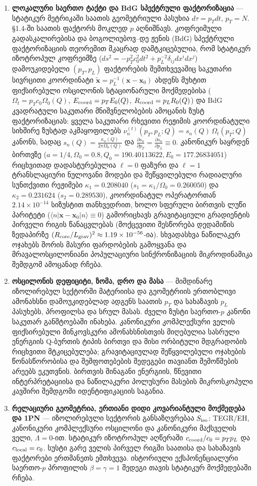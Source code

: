 \documentclass[11pt,a4paper]{article}
\begin{document}
\begin{enumerate}[label=\arabic*.]
\item \textbf{ლოკალური საერთო ტაქტი და BdG სპექტრული ფაქტორიზაცია} — სტატიკურ მეტრიკაში საათის გეომეტრიული პასუხია $d\tau=p_Tdt$, $p_T=N$. §1.4-ში საათის ფაქტორს მოკლედ $p$ აღნიშნავს. კოფრეიმული გადასკალირებისა და ბოგოლიუბოვ–დე ჟენის (BdG) სპექტრული ფაქტორიზაციის თეორემით მკაცრად დამტკიცებულია, რომ სტატიკურ იზოტროპულ კოფრეიმზე ($ds^2 = -p_T^2 c_0^2 dt^2 + p_L^{-2}\delta_{ij}dx^i dx^j$) დამოუკიდებელი $(p_T, p_L)$ ფაქტორების შემთხვევაშიც საკუთარი სივრცითი კოორდინატი $\tilde{\mathbf{x}} = p_L^{-1}(\mathbf{x}-\mathbf{x}_0)$ ახდენს მუხტით ფიქსირებული ოსცილონის სტაციონარული მოქმედებისა ($\Omega_t = p_T c_0\Omega_0(Q)$, $E_{\rm coord} = p_T E_0(Q)$, $R_{\rm coord} = p_L R_0(Q)$) და BdG კვადრატული საკუთარი მნიშვნელობების ამოცანის ზუსტ ფაქტორიზაციას: ყველა საკუთარი რხევითი რეჟიმის კოორდინატული სიხშირე ზუსტად აკმაყოფილებს $\nu_n^{(t)}(p_T, p_L; Q) = s_n(Q)\,\Omega_t(p_T; Q)$ კანონს, სადაც $s_n(Q) = \frac{\kappa_n(Q)}{2\pi\Omega_0(Q)}$ და $\frac{\partial s_n}{\partial p_T} = \frac{\partial s_n}{\partial p_L} \equiv 0$. კანონიკურ საყრდენ ბირთვზე ($a=1/4, \Omega_0=0.8, Q_0 = 190.40113622, E_0 = 177.26834051$) რიცხვითად დადასტურებულია $\ell=0$ ფაზური და $\ell=1$ ტრანსლაციური ნულოვანი მოდები და შეწყვილებული რადიალური სუნთქვითი რეჟიმები $\kappa_1 = 0.208040$ ($s_1 = \kappa_1/\Omega_0 = 0.260050$) და $\kappa_2 = 0.231624$ ($s_2 = 0.289530$), კოორდინატულ ოპერატორთან $2.14\times 10^{-14}$ სიზუსტით თანხვედრით, ხოლო სფერული ბირთვის ლუწი პარიტეტი ($\langle n|\mathbf{x}-\mathbf{x}_0|n\rangle \equiv 0$) გამორიცხავს გრავიტაციული გრადიენტის პირველი რიგის წანაცვლებას (მოქცევითი შესწორება დედამიწის ზედაპირზე $(R_{\rm core}/L_{\rm grav})^2 \approx 1.19\times 10^{-56}$-ია). სხვადასხვა ნაწილაკურ ოჯახებს შორის მასური ფარდობების გამოყვანა და მრავალოსცილონიანი პოპულაციური სინქრონიზაციის მიკროდინამიკა შემდგომ ამოცანად რჩება.
\item \textbf{ოსცილონის დეფიციტი, ზომა, დრო და მასა} — მიმდინარე იზოლირებულ სექტორში მატერიისა და გეომეტრიის ერთობლივი ამონახსნი დამოუკიდებლად ადგენს საათის $p_T$ და სახაზავის $p_L$ პასუხებს, პროფილსა და სრულ მასას. ძველი ზუსტი საერთო-$p$ კანონი საკუთარ განშტოებაში ინახება. კანონიკური კომპლექსური ველის ფიქსირებული მინკოვსკური ამონახსნისთვის მიღებულია სასრული ენერგიის Q-ბურთის ტიპის ბირთვი და მისი ორბიტული მდგრადობის რიცხვითი მტკიცებულება; გრავიტაციულად შეწყვილებული ოჯახების წონასწორობისა და შეშფოთებების შედეგები თავიანთ შემოწმების არეებს ეკუთვნის. ბირთვის შინაგანი ენერგიის, წნევითი ინტერპრეტაციისა და ნაწილაკური პოლუსური მასების მიკროსკოპული კავშირი შემდგომი იდენტიფიკაციის საგანია.
\item \textbf{რელაციური გეომეტრია, ერთიანი დიდი კოვარიანტული მოქმედება და 1PN} — იზოლირებული სექტორის განსაზღვრებაა $S_{\rm iso}$: TEGR/EH, კანონიკური კომპლექსური ოსცილონი და კანონიკური მაქსველის ველი, $\Lambda=0$-ით. სტატიკურ იზოტროპულ აღწერაში $c_{\rm coord}/c_0=p_Tp_L$ და $c_{\rm local}=c_0$. სუსტი გარე ველის პირველ რიგში საათისა და სახაზავის ფაქტორები ერთმანეთს ემთხვევა. ისტორიული ექსპონენციალური საერთო-$p$ პროფილის $\beta=\gamma=1$ შედეგი თავის სტატიკურ მოქმედებაში რჩება.


\end{enumerate}
\end{document}

